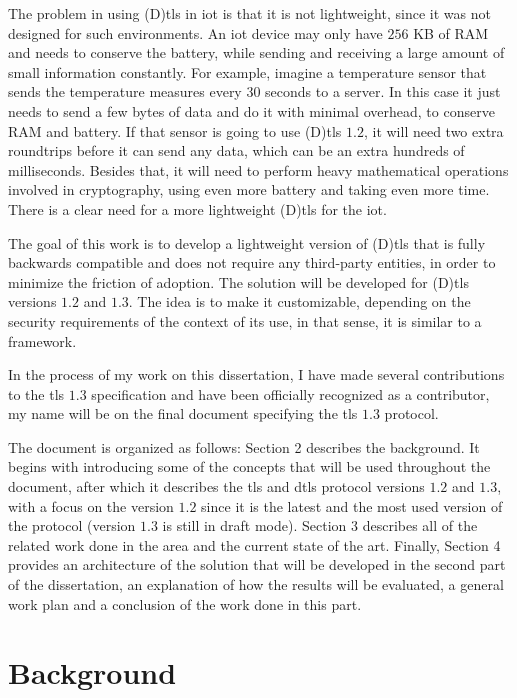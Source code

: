 \documentclass{llncs}
\begin{document}
The problem in using (D)\gls{tls} in \gls{iot} is that it is not lightweight, since
it was not designed for such environments. An \gls{iot} device may only have
$256$ KB of RAM and needs to conserve the battery, while sending and receiving
a large amount of small information constantly. For example, imagine a temperature sensor
that sends the temperature measures every $30$ seconds to a server. In this case
it just needs to send a few bytes of data and do it with minimal overhead, to conserve
RAM and battery. If that sensor is going to use (D)\gls{tls} $1.2$, it will need
two extra roundtrips before it can send any data, which can be an extra hundreds of
milliseconds. Besides that, it will need to perform heavy mathematical operations
involved in cryptography, using even more battery and taking even more time.
There is a clear need for a more lightweight (D)\gls{tls} for the \gls{iot}.

The goal of this work is to develop a lightweight version of (D)\gls{tls} that is
fully backwards compatible and does not require any third-party entities, in order
to minimize the friction of adoption. The solution will be developed for
(D)\gls{tls} versions $1.2$ and $1.3$. The idea is to make it customizable,
depending on the security requirements of the context of its use, in that sense, it is similar to a framework.

In the process of my work on this dissertation, I have made several
contributions to the \gls{tls} $1.3$ specification and have been officially
recognized as a contributor, my name will be on the final document specifying
the \gls{tls} $1.3$ protocol.

The document is organized as follows: Section 2 describes the background. It
begins with introducing some of the concepts that will be used throughout
the document, after which it describes the \gls{tls} and \gls{dtls} protocol
versions $1.2$ and $1.3$, with a focus on the version $1.2$ since
it is the latest and the most used version of the protocol (version $1.3$ is still in
draft mode). Section 3 describes all of the related work done in the area and
the current state of the art. Finally, Section 4 provides an architecture of the
solution that will be developed in the second part of the dissertation,
an explanation of how the results will be evaluated, a general work plan
and a conclusion of the work done in this part.

\section{Background}
\end{document}
